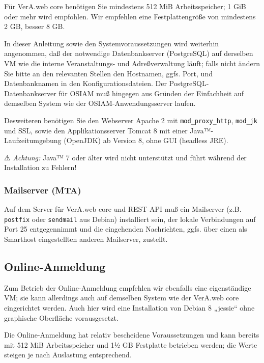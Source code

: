 Für VerA.web core benötigen Sie mindestens 512 MiB Arbeitsspeicher;
1 GiB oder mehr wird empfohlen. Wir empfehlen eine Festplattengröße
von mindestens 2 GB, besser 8 GB.

In dieser Anleitung sowie den Systemvoraussetzungen wird weiterhin
angenommen, daß der notwendige Datenbankserver (PostgreSQL) auf
derselben VM wie die interne Veranstaltungs- und Adreßverwaltung läuft;
falls nicht ändern Sie bitte an den relevanten Stellen den Hostnamen,
ggfs. Port, und Datenbanknamen in den Konfigurationsdateien.
\ifoa
Der PostgreSQL-Datenbankserver für OSIAM muß hingegen aus Gründen der
Einfachheit auf demselben System wie der OSIAM-Anwendungsserver laufen.
\fi%

Desweiteren benötigen Sie den Webserver Apache 2 mit
\ifoa
\texttt{mod\_proxy\_http},
\fi%
\texttt{mod\_jk} und SSL, sowie den Applikationsserver Tomcat 8
mit einer Java™-Laufzeitumgebung (OpenJDK) ab Version 8,
ohne GUI (headless JRE).

⚠ \emph{Achtung:} Java™ 7 oder älter wird nicht unterstützt
und führt während der Installation zu Fehlern!

\subsubsection{Mailserver (MTA)}\label{subsubsec:req-core-mta}

Auf dem Server für VerA.web core und REST-API muß ein Mailserver
(z.B. \texttt{postfix} oder \texttt{sendmail} aus Debian)
installiert sein, der lokale Verbindungen auf Port 25 entgegennimmt
und die eingehenden Nachrichten, ggfs. über einen als Smarthost
eingestellten anderen Mailserver, zustellt.

\ifoa

\subsection{Online-Anmeldung}\label{subseq:req-oa}

Zum Betrieb der Online-Anmeldung empfehlen wir ebenfalls eine
eigenständige VM; sie kann allerdings auch auf demselben System
wie der VerA.web core eingerichtet werden. Auch hier wird eine
Installation von Debian 8 „jessie“ ohne
graphische Oberfläche vorausgesetzt.

Die Online-Anmeldung hat relativ bescheidene Voraussetzungen
und kann bereits mit 512 MiB Arbeitsspeicher und 1½ GB Festplatte
betrieben werden; die Werte steigen je nach Auslastung entsprechend.

